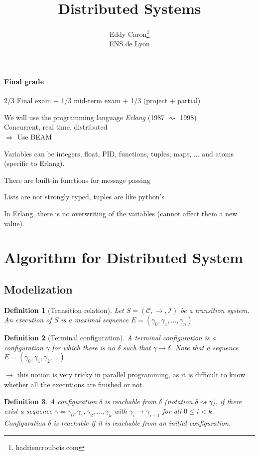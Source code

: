 \documentclass{article}
\title{Distributed Systems}
\author{Eddy Caron\footnote{hadriencroubois.com}\\
\small ENS de Lyon}
\date{}
\newtheorem{defi}{Definition}
\begin{document}
\maketitle
\tableofcontents
\newpage


\paragraph{Final grade} 2/3 Final exam + 1/3 mid-term exam + 1/3 (project + partial)


\bigskip
We will use the programming language \emph{Erlang} (1987 $\rightsquigarrow$ 1998)\\
\textbullet \; Concurrent, real time, distributed\\
$\Rightarrow$ Use BEAM
\bigskip

Variables can be integers, float, PID, functions, tuples, maps, ... and atoms (specific to Erlang).

There are built-in functions for message passing

Lists are not strongly typed, tuples are like python's

In Erlang, there is no overwriting of the variables (cannot affect them a new value).

\section{Algorithm for Distributed System}
\subsection{Modelization}
\begin{defi}[Transition relation]
Let $S=(\mathcal{C},\to,\mathcal{I})$ be a transition system. An execution of $S$ is a \emph{maximal sequence} $E=(\gamma_0,\gamma_1,...,\gamma_n)$
\end{defi}


\begin{defi}[Terminal configuration]
A \emph{terminal configuration} is a configuration $\gamma$ for which there is no $\delta$ such that $\gamma \to \delta$. Note that a sequence $E=(\gamma_0,\gamma_1,\gamma_2,...)$
\end{defi}

$\to$ this notion is very tricky in parallel programming, as it is difficult to know whether all the executions are finished or not. 

\begin{defi}
A configuration $\delta$ is \emph{reachable} from $\delta$ (notation $\delta \rightsquigarrow \gamma$), if there exist a sequence $\gamma=\gamma_0,\gamma_1,\gamma_2,...,\gamma_k$ with $\gamma_i \to \gamma_{i+1}$ for all $0\leq i <k$. Configuration $\delta$ is reachable if it is reachable from an initial configuration.
\end{defi}
\end{document}
